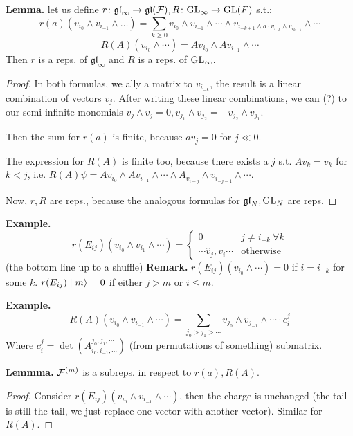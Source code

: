 \documentclass[]{../../../../tex/classes/styledArticle}
\newcommand\gl {\mathfrak{gl}}
\begin{document}
	\textbf{Lemma. }let us define $r \co \gl_\infty \to \gl(\fc), R \co \gGL_\infty \to \gGL(F)$ s.t.: 
	\[ r(a)(v_{i_0} \land v_{i_{-1}} \land \dots ) = \sum_{k \ge 0}v_{i_0} \land v_{i_{-1}} \land \cdots \land v_{i_{-k + 1 } \land a \cdot v_{i_{-k}} \land v_{i_{k - 1}}} \land \cdots  \]
	\[ R(A)(v_{i_0} \land \cdots ) = Av_{i_0} \land Av_{i_{-1}} \land \cdots \]
	Then $r$ is a reps. of $\gl_\infty$ and $R$ is a reps. of $\mathrm{GL}_\infty$. 
	\begin{proof}
		In both formulas, we ally a matrix to $v_{i_{-k}}$, the result is a linear combination of vectors $v_j$. After writing these linear combinations, we can (?) to our semi-infinite-monomials $v_j \land v_j =0, v_{j_1} \land v_{j_2} = -v_{j_2}\land v_{j_1}$. 
		
		Then the sum for $r(a)$ is finite, because $av_j =0$ for $j \ll 0$. 
		
		The expression for $R(A)$ is finite too, because there exists a $j$ s.t. $Av_k = v_k$ for $k < j$, i.e. $R(A) \psi = Av_{i_0} \land Av_{i_{-1}} \land \cdots \land A_{v_{i - j}} \land v_{i_{-j - 1}} \land \cdots$. 
		
		Now, $r, R$ are reps., because the analogous formulas for $\gl_N, \gGL_N$ are reps. 
	\end{proof}
	
	\textbf{Example. }
	\[ r(E_{ij})(v_{i_0} \land v_{i_1} \land \cdots) = \begin{cases}
		0 & j \neq i_{-k} \ \forall k \\
		\cdots \hat v_j, v_i \cdots & \text{otherwise}
	\end{cases} \]
	(the bottom line up to a shuffle)
	\textbf{Remark. }$r(E_{ij})(v_{i_0} \land \cdots) = 0$  if $i = i_{-k}$ for some $k$. $r(E_{ij})\mid m \rangle = 0$ if either $j > m$ or $i \le m$. 
	
	\textbf{Example. }
	\[ R(A)(v_{i_0} \land v_{i_{-1}} \land \cdots) = \sum_{j_0 > j_1 > \cdots}v_{j_0} \land v_{j_{-1}} \land \cdots \cdot c_{i}^{j} \]
	Where $c_i^{j} = \det(A_{i_0, i_{-1}, \cdots}^{j_0, j_1, \cdots })$ (from permutations of something) submatrix. 
	
	\textbf{Lemmma. }$\mathcal{F}^{(m)}$ is a subreps. in respect to $r(a), R(A)$. \begin{proof}
		Consider $r(E_{ij})(v_{i_0} \land v_{i_{-1}} \land \cdots )$, then the charge is unchanged (the tail is still the tail, we just replace one vector with another vector). Similar for $R(A)$. 
	\end{proof}
	
\end{document}
